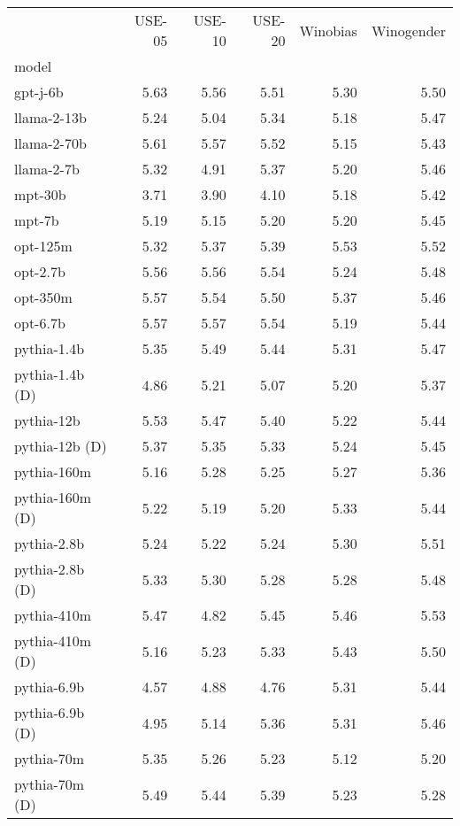 \begin{tabular}{lrrrrr}
 & USE-05 & USE-10 & USE-20 & Winobias & Winogender \\
model &  &  &  &  &  \\
gpt-j-6b & 5.63 & 5.56 & 5.51 & 5.30 & 5.50 \\
llama-2-13b & 5.24 & 5.04 & 5.34 & 5.18 & 5.47 \\
llama-2-70b & 5.61 & 5.57 & 5.52 & 5.15 & 5.43 \\
llama-2-7b & 5.32 & 4.91 & 5.37 & 5.20 & 5.46 \\
mpt-30b & 3.71 & 3.90 & 4.10 & 5.18 & 5.42 \\
mpt-7b & 5.19 & 5.15 & 5.20 & 5.20 & 5.45 \\
opt-125m & 5.32 & 5.37 & 5.39 & 5.53 & 5.52 \\
opt-2.7b & 5.56 & 5.56 & 5.54 & 5.24 & 5.48 \\
opt-350m & 5.57 & 5.54 & 5.50 & 5.37 & 5.46 \\
opt-6.7b & 5.57 & 5.57 & 5.54 & 5.19 & 5.44 \\
pythia-1.4b & 5.35 & 5.49 & 5.44 & 5.31 & 5.47 \\
pythia-1.4b (D) & 4.86 & 5.21 & 5.07 & 5.20 & 5.37 \\
pythia-12b & 5.53 & 5.47 & 5.40 & 5.22 & 5.44 \\
pythia-12b (D) & 5.37 & 5.35 & 5.33 & 5.24 & 5.45 \\
pythia-160m & 5.16 & 5.28 & 5.25 & 5.27 & 5.36 \\
pythia-160m (D) & 5.22 & 5.19 & 5.20 & 5.33 & 5.44 \\
pythia-2.8b & 5.24 & 5.22 & 5.24 & 5.30 & 5.51 \\
pythia-2.8b (D) & 5.33 & 5.30 & 5.28 & 5.28 & 5.48 \\
pythia-410m & 5.47 & 4.82 & 5.45 & 5.46 & 5.53 \\
pythia-410m (D) & 5.16 & 5.23 & 5.33 & 5.43 & 5.50 \\
pythia-6.9b & 4.57 & 4.88 & 4.76 & 5.31 & 5.44 \\
pythia-6.9b (D) & 4.95 & 5.14 & 5.36 & 5.31 & 5.46 \\
pythia-70m & 5.35 & 5.26 & 5.23 & 5.12 & 5.20 \\
pythia-70m (D) & 5.49 & 5.44 & 5.39 & 5.23 & 5.28 \\
\end{tabular}
